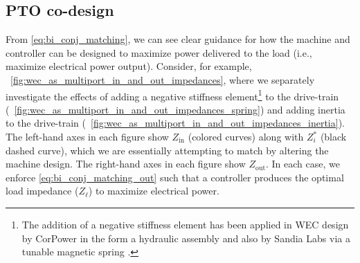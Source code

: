 \documentclass[lettersize,journal]{IEEEtran}
\begin{document}
\subsection{PTO co-design}\label{sec:pto_codesign}
From \eqref{eq:bi_conj_matching}, we can see clear guidance for how the machine and controller can be designed to maximize power delivered to the load (i.e., maximize electrical power output).
Consider, for example, \figurename~\ref{fig:wec_as_multiport_in_and_out_impedances}, where we separately investigate the effects of adding a negative stiffness element\footnote{The addition of a negative stiffness element has been applied in WEC design by CorPower in the form a hydraulic assembly \cite{Todalshaug:2016aa} and also by Sandia Labs via a tunable magnetic spring \cite{Forbush:2024aa}.} to the drive-train (\figurename~\ref{fig:wec_as_multiport_in_and_out_impedances_spring}) and adding inertia to the drive-train (\figurename~\ref{fig:wec_as_multiport_in_and_out_impedances_inertia}).
The left-hand axes in each figure show $Z_{\textrm{in}}$ (colored curves) along with $Z_i^*$ (black dashed curve), which we are essentially attempting to match by altering the machine design.
The right-hand axes in each figure show $Z_{\textrm{out}}$.
In each case, we enforce \eqref{eq:bi_conj_matching_out} such that a controller produces the optimal load impedance ($Z_\ell$) to maximize electrical power.
\end{document}
